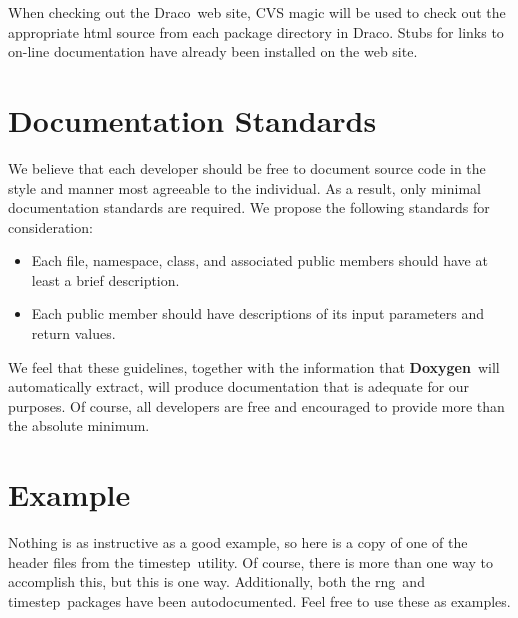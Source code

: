 \documentclass[11pt]{nmemo}
\newcommand{\draco}{{\normalfont\sffamily Draco}}
\newcommand{\doxy}{{\normalfont\bfseries Doxygen}}
\newcommand{\rng}{{\normalfont\sffamily rng}}
\newcommand{\timestep}{{\normalfont\sffamily timestep}}
\begin{document}
When checking out the \draco\ web site, CVS magic will be used to
check out the appropriate html source from each package directory in
\draco. Stubs for links to on-line documentation have already been
installed on the web site.

\section{Documentation Standards}

We believe that each developer should be free to document source code
in the style and manner most agreeable to the individual. As a result,
only minimal documentation standards are required.  We propose the
following standards for consideration:

\begin{itemize}
\item Each file, namespace, class, and associated public members
  should have at least a brief description.
\item Each public member should have descriptions of its input
  parameters and return values.
\end{itemize}

We feel that these guidelines, together with the information that
\doxy\ will automatically extract, will produce documentation that is
adequate for our purposes. Of course, all developers are free and
encouraged to provide more than the absolute minimum.


\section{Example}

Nothing is as instructive as a good example, so here is a copy of
one of the header files from the \timestep\ utility. Of course,
there is more than one way to accomplish this, but this is one way.
Additionally, both the \rng\ and \timestep\ packages have been
autodocumented.  Feel free to use these as examples.
\end{document}
